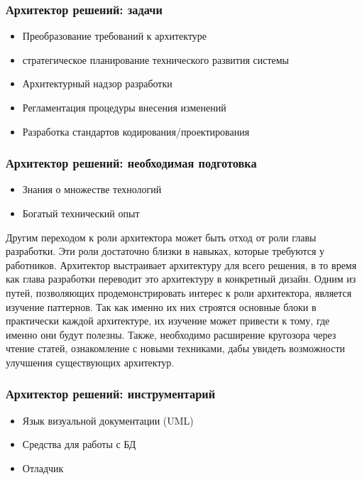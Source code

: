 \documentclass{../industrial-development}
\begin{document}
\begin{frame} \frametitle{Архитектор решений: задачи}
  \begin{itemize}
  \item Преобразование требований к архитектуре
  \item стратегическое планирование технического развития системы
  \item Архитектурный надзор разработки
  \item Регламентация процедуры внесения изменений
  \item Разработка стандартов кодирования/проектирования
  \end{itemize}
\end{frame}

\lecturenotes

\begin{frame} \frametitle{Архитектор решений: необходимая подготовка}
  \begin{itemize}
  \item Знания о множестве технологий
  \item Богатый технический опыт
  \end{itemize}
\end{frame}

\lecturenotes
Другим переходом к роли архитектора может быть отход от роли главы разработки. Эти роли достаточно близки в навыках, которые требуются у работников. Архитектор выстраивает архитектуру для всего решения, в то время как глава разработки переводит это архитектуру в конкретный дизайн. 
Одним из путей, позволяющих продемонстрировать интерес к роли архитектора, является изучение паттернов. Так как именно их них строятся основные блоки в практически каждой архитектуре, их изучение может привести к тому, где именно они будут полезны. Также, необходимо расширение кругозора через чтение статей, ознакомление с новыми техниками, дабы увидеть возможности улучшения существующих архитектур. 
 ~\cite{Anatomy}

\begin{frame} \frametitle{Архитектор решений: инструментарий}
  \begin{itemize}
  \item Язык визуальной документации (UML)
  \item Средства для работы с БД
  \item Отладчик
  \end{itemize}
\end{frame}

\lecturenotes
\end{document}
